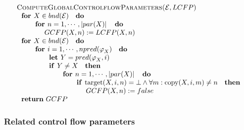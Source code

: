 \begin{equation*}
\begin{tabular}{l}
\textsc{ComputeGlobalControlflowParameters(}$\mathcal{E},LCFP$\textsc{)} \\ 
$\text{\textbf{for }}X\in bnd(\mathcal{E})\text{ \textbf{do}}$ \\ 
$\qquad \text{\textbf{for }}n=1,\cdots ,\left\vert par(X)\right\vert \text{ 
\textbf{do}}$ \\ 
$\qquad \qquad GCFP(X,n):=LCFP(X,n)$ \\ 
$\text{\textbf{for }}X\in bnd(\mathcal{E})\text{ \textbf{do}}$ \\ 
$\qquad \text{\textbf{for }}i=1,\cdots ,npred(\varphi _{X})\text{ \textbf{do}%
}$ \\ 
$\qquad \qquad \text{\textbf{let }}Y=pred(\varphi _{X},i)$ \\ 
$\qquad \qquad \text{\textbf{if }}Y\neq X\text{ \textbf{then}}$ \\ 
$\qquad \qquad \qquad \text{\textbf{for }}n=1,\cdots ,\left\vert
par(X)\right\vert \text{ \textbf{do}}$ \\ 
$\qquad \qquad \qquad \qquad \text{\textbf{if }}\mathrm{target}(X,i,n)=\bot
\wedge \forall m:\mathrm{copy}(X,i,m)\neq n\text{ \textbf{then}}$ \\ 
$\qquad \qquad \qquad \qquad \qquad GCFP(X,n):=false$ \\ 
$\text{\textbf{return} }GCFP$%
\end{tabular}%
\end{equation*}%
\newline

\subsubsection{Related control flow parameters}

